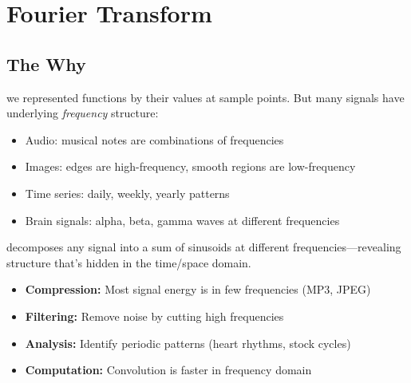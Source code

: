 \chapter{Fourier Transform}



\section{The Why}

 we represented functions by their values at sample points.
But many signals have underlying \emph{frequency} structure:
\begin{itemize}
    \item Audio: musical notes are combinations of frequencies
    \item Images: edges are high-frequency, smooth regions are low-frequency
    \item Time series: daily, weekly, yearly patterns
    \item Brain signals: alpha, beta, gamma waves at different frequencies
\end{itemize}

 decomposes any signal into a sum of sinusoids at different frequencies---revealing structure that's hidden in the time/space domain.


\begin{itemize}
    \item \textbf{Compression:} Most signal energy is in few frequencies (MP3, JPEG)
    \item \textbf{Filtering:} Remove noise by cutting high frequencies
    \item \textbf{Analysis:} Identify periodic patterns (heart rhythms, stock cycles)
    \item \textbf{Computation:} Convolution is faster in frequency domain
\end{itemize}

